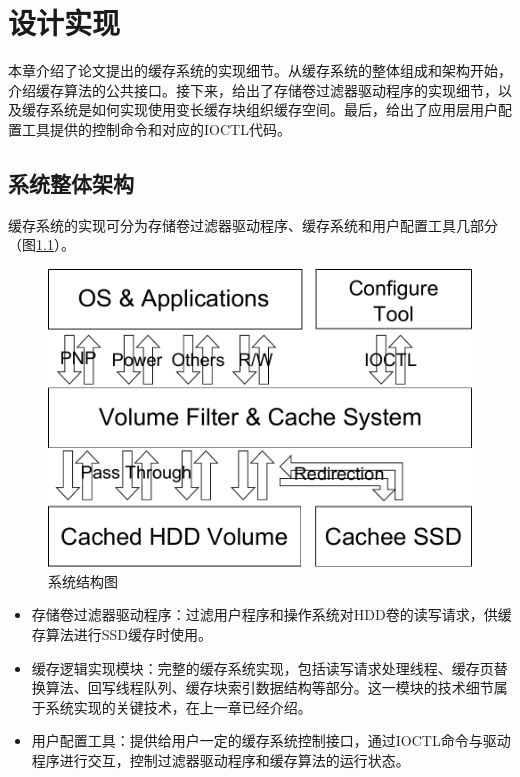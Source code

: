 
\chapter{设计实现}
\label{cha:mainmatter}

本章介绍了论文提出的缓存系统的实现细节。从缓存系统的整体组成和架构开始，介绍缓存算法的公共接口。接下来，给出了存储卷过滤器驱动程序的实现细节，以及缓存系统是如何实现使用变长缓存块组织缓存空间。最后，给出了应用层用户配置工具提供的控制命令和对应的IOCTL代码。

\section{系统整体架构}
\label{sec:system_overview}

缓存系统的实现可分为存储卷过滤器驱动程序、缓存系统和用户配置工具几部分（图\ref{fig:sys-overview}）。

\begin{figure}[H]
\centering
\includegraphics[width=0.6\linewidth]{./graph/sys-overview}
\caption{系统结构图}
\label{fig:sys-overview}
\end{figure}

\begin{itemize}
\item
存储卷过滤器驱动程序：过滤用户程序和操作系统对HDD卷的读写请求，供缓存算法进行SSD缓存时使用。
\item
缓存逻辑实现模块：完整的缓存系统实现，包括读写请求处理线程、缓存页替换算法、回写线程队列、缓存块索引数据结构等部分。这一模块的技术细节属于系统实现的关键技术，在上一章已经介绍。
\item
用户配置工具：提供给用户一定的缓存系统控制接口，通过IOCTL命令与驱动程序进行交互，控制过滤器驱动程序和缓存算法的运行状态。
\end{itemize}

